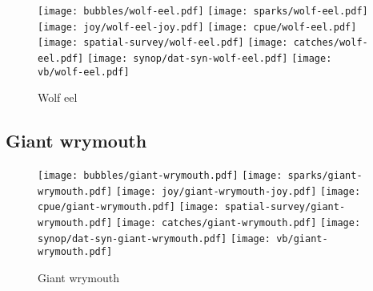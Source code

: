 \begin{figure}[htbp]
\centering
\texttt{[image: bubbles/wolf-eel.pdf]}
\texttt{[image: sparks/wolf-eel.pdf]}
\texttt{[image: joy/wolf-eel-joy.pdf]}
\texttt{[image: cpue/wolf-eel.pdf]}
\texttt{[image: spatial-survey/wolf-eel.pdf]}
\texttt{[image: catches/wolf-eel.pdf]}
\texttt{[image: synop/dat-syn-wolf-eel.pdf]}
\texttt{[image: vb/wolf-eel.pdf]}
\caption{Wolf eel}
\end{figure}
\clearpage
\subsection*{Giant wrymouth}

\begin{figure}[htbp]
\centering
\texttt{[image: bubbles/giant-wrymouth.pdf]}
\texttt{[image: sparks/giant-wrymouth.pdf]}
\texttt{[image: joy/giant-wrymouth-joy.pdf]}
\texttt{[image: cpue/giant-wrymouth.pdf]}
\texttt{[image: spatial-survey/giant-wrymouth.pdf]}
\texttt{[image: catches/giant-wrymouth.pdf]}
\texttt{[image: synop/dat-syn-giant-wrymouth.pdf]}
\texttt{[image: vb/giant-wrymouth.pdf]}
\caption{Giant wrymouth}
\end{figure}
\clearpage

